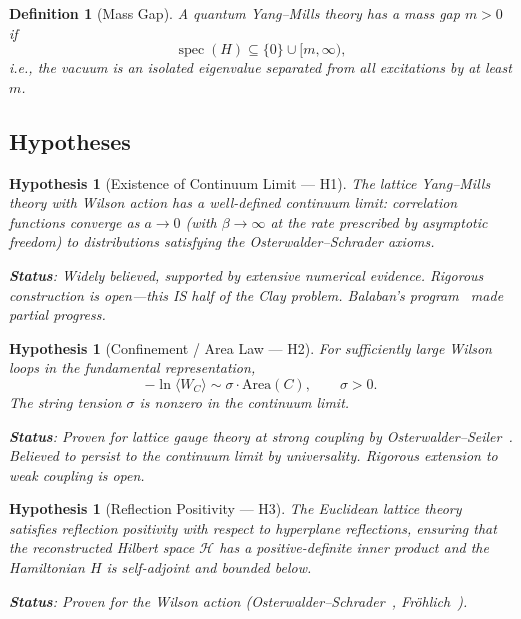 \documentclass[11pt]{article}
\newtheorem{definition}[theorem]{Definition}
\newtheorem{hypothesis}[theorem]{Hypothesis}
\DeclareMathOperator{\spec}{spec}
\begin{document}
\begin{definition}[Mass Gap]
\label{def:mass-gap}
A quantum Yang--Mills theory has a \emph{mass gap} $m > 0$ if
\begin{equation}\label{eq:mass-gap-spec}
  \spec(H) \subseteq \{0\} \cup [m, \infty),
\end{equation}
i.e., the vacuum is an isolated eigenvalue separated from all
excitations by at least $m$.
\end{definition}

\subsection{Hypotheses}

\begin{hypothesis}[Existence of Continuum Limit --- H1]
\label{hyp:H1}
The lattice Yang--Mills theory with Wilson action has a well-defined
continuum limit: correlation functions converge as $a \to 0$ (with
$\beta \to \infty$ at the rate prescribed by asymptotic freedom) to
distributions satisfying the Osterwalder--Schrader axioms.

\smallskip\noindent
\textbf{Status}: Widely believed, supported by extensive numerical
evidence.  Rigorous construction is open---this IS half of the Clay
problem.  Balaban's program~\cite{Balaban} made partial progress.
\end{hypothesis}

\begin{hypothesis}[Confinement / Area Law --- H2]
\label{hyp:H2}
For sufficiently large Wilson loops in the fundamental representation,
\begin{equation}\label{eq:confinement}
  -\ln\langle W_C \rangle \sim \sigma \cdot \mathrm{Area}(C),
  \qquad \sigma > 0.
\end{equation}
The string tension $\sigma$ is nonzero in the continuum limit.

\smallskip\noindent
\textbf{Status}: Proven for lattice gauge theory at strong coupling by
Osterwalder--Seiler~\cite{OS}.  Believed to persist to the continuum
limit by universality.  Rigorous extension to weak coupling is open.
\end{hypothesis}

\begin{hypothesis}[Reflection Positivity --- H3]
\label{hyp:H3}
The Euclidean lattice theory satisfies reflection positivity with
respect to hyperplane reflections, ensuring that the reconstructed
Hilbert space $\mathcal{H}$ has a positive-definite inner product
and the Hamiltonian $H$ is self-adjoint and bounded below.

\smallskip\noindent
\textbf{Status}: Proven for the Wilson action
(Osterwalder--Schrader~\cite{OstSchr}, Fr\"ohlich~\cite{Froh}).
\end{hypothesis}
\end{document}
